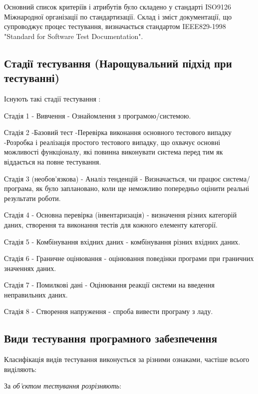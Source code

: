 Основний список критеріїв і атрибутів було складено
у стандарті ISO9126 Міжнародної організації по стандартизації.
Склад і зміст документації, що супроводжує процес тестування,
визначається стандартом IEEE829-1998 "Standard for Software Test Documentation".

\subsection{Стадії тестування (Нарощувальний підхід при тестуванні)}

Існують такі стадії тестування \cite{testing-black,iso-software-eng}:

Стадія 1 - Вивчення - Ознайомлення з програмою/системою.

Стадія 2 -Базовий тест -Перевірка виконання основного тестового випадку 
-Розробка і реалізація простого тестового випадку,
що охвачує основні можливості функціоналу, які повинна виконувати система
перед тим як віддається на повне тестування.

Стадія 3 (необов’язкова) - Аналіз тенденцій
- Визначається, чи працює система/програма, як було заплановано,
коли ще неможливо попередньо оцінити реальні результати роботи.

Стадія 4 - Основна перевірка (інвентаризація) - визначення різних категорій даних,
створення та виконання тестів для кожного елементу категорії.

Стадія 5 - Комбінування вхідних даних - комбінування різних вхідних даних.

Стадія 6 - Граничне оцінювання - оцінювання поведінки програми при граничних значеннях даних.

Стадія 7 - Помилкові дані - Оцінювання реакції системи на введення неправильних даних.

Стадія 8 - Створення напруження - спроба вивести програму з ладу.

\subsection{Види тестування програмного забезпечення}

Класифікація видів тестування виконується за різними ознаками,
частіше всього виділяють:

За \emph{об'єктом тестування розрізняють}:

